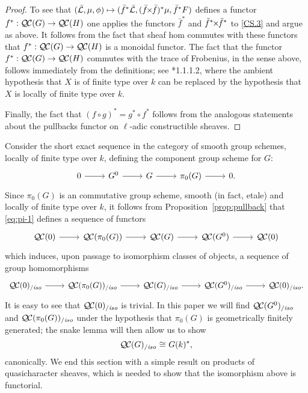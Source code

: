 \documentclass[11pt]{amsart}
\theoremstyle{plain}
\theoremstyle{definition}
\theoremstyle{remark}
\newcommand{\EE}{\mathbb{\bar Q}_\ell}
\newcommand{\Fq}{k}
\DeclareMathOperator{\Hom}{Hom}
\newcommand{\iso}{{\ \cong\ }}
\newcommand{\gcs}[1]{{\mathcal{\bar #1}}}
\newcommand{\QC}{{\mathcal{Q\hskip-0.8pt C}}}
\newcommand{\QCiso}[1]{\QC(#1)_{/\textit{iso}}}
\renewcommand{\bf}{\bar{f}}
\newcommand{\tight}[3]{\hspace{-#1pt}{#2}\hspace{-#3pt}}
\newcommand{\bfxf}{\text{$\bar{f} \tight{1}{\times}{1} \bar{f}$}}
\newcommand\David[1]{\marginpar{\smaller\smaller DR: #1}}
\begin{document}
\begin{proof}
  To see that $(\gcs{L},\mu,\phi) \mapsto (\bf^*\gcs{L},(\bfxf)^*\mu,\bf^*F)$
  defines a functor $f^* : \QC(G) \to \QC(H)$ one applies the functors $\bf^*$ and
  $\bf^*\tight{1}{\times}{1}\bf^*$ to \ref{CS.3} and argue as
  above. It follows from the fact that sheaf hom commutes with these
  functors that $f^* : \QC(G) \to \QC(H)$ is a monoidal functor.
%
  The fact that the functor $f^* : \QC(G) \to \QC(H)$ commutes with
  the trace of Frobenius, in the sense above, follows immediately from
  the definitions; see \cite{Laumon}*{1.1.1.2}, where the ambient
  hypothesis that $X$ is of finite type over $\Fq$ can be replaced by
  the hypothesis that $X$ is locally of finite type over $\Fq$.
  
  Finally, the fact that $(f\circ g)^* = g^* \circ f^*$ follows from the analogous
  statements about the pullbacks functor on $\ell$-adic constructible sheaves.
\end{proof}

Consider the short exact sequence in the category of smooth group
schemes, locally of finite type over $\Fq$, defining the component
group scheme for $G$:
\begin{equation}\label{eq:pi-2}
\begin{tikzcd}
0 \rar & G^0 \rar & G \rar & \pi_0(G) \rar & 0.
\end{tikzcd}
\end{equation}
Since $\pi_0(G)$ is an commutative group scheme, smooth (in fact, etale) and locally of finite type over $\Fq$, 
it follows from Proposition~\ref{prop:pullback} that \eqref{eq:pi-1} defines a sequence of functors
\[
\begin{tikzcd}
\QC(0) \rar & \QC(\pi_0(G)) \rar & \QC(G) \rar & \QC(G^0) \rar & \QC(0)
\end{tikzcd}
\]
which induces, upon passage to isomorphism classes of objects, a sequence of group homomorphisms 
\begin{equation}\label{eq:pi-1}
\begin{tikzcd}
\QCiso{0} \rar & \QCiso{\pi_0(G)} \rar & \QCiso{G} \rar & \QCiso{G^0} \rar & \QCiso{0}.
\end{tikzcd}
\end{equation}
It is easy to see that $\QCiso{0}$ is trivial. In this paper we will find $\QCiso{G^0}$ and $\QCiso{\pi_0(G)}$ under the hypothesis that $\pi_0(G)$ is geometrically finitely generated; 
the snake lemma will then allow us to show
\[
\QCiso{G} \iso G(\Fq)^*,%
\]
canonically.
We end this section with a simple result on products of quasicharacter sheaves, which is needed to show that the isomorphism above is functorial.
\end{document}
